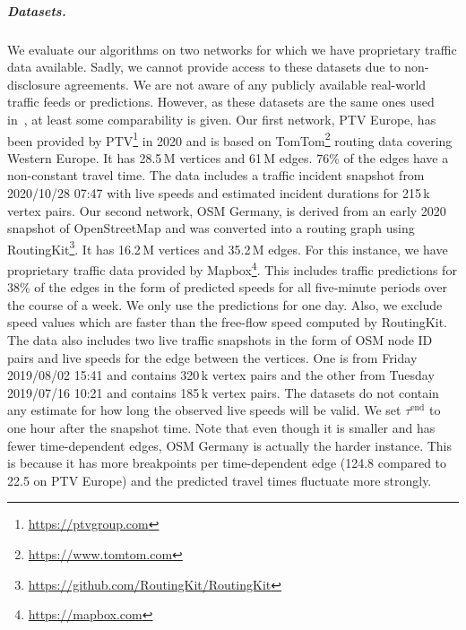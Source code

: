\documentclass[a4paper,UKenglish,cleveref, autoref, thm-restate]{lipics-v2021}
\newcommand*{\tend}{\tau^{\operatorname{end}}}
\begin{document}
\subparagraph{Datasets.}
We evaluate our algorithms on two networks for which we have proprietary traffic data available.
Sadly, we cannot provide access to these datasets due to non-disclosure agreements.
We are not aware of any publicly available real-world traffic feeds or predictions.
However, as these datasets are the same ones used in~\cite{swz-sfert-21,strasser_et_al:LIPIcs.SEA.2021.6}, at least some comparability is given.
%
Our first network, PTV Europe, has been provided by PTV\footnote{\url{https://ptvgroup.com}} in 2020 and is based on TomTom\footnote{\url{https://www.tomtom.com}} routing data covering Western Europe.
It has 28.5\,M vertices and 61\,M edges.
76\% of the edges have a non-constant travel time.
The data includes a traffic incident snapshot from 2020/10/28 07:47 with live speeds and estimated incident durations for 215\,k vertex pairs.
%
Our second network, OSM Germany, is derived from an early 2020 snapshot of OpenStreetMap and was converted into a routing graph using RoutingKit\footnote{\url{https://github.com/RoutingKit/RoutingKit}}.
It has 16.2\,M vertices and 35.2\,M edges.
For this instance, we have proprietary traffic data provided by Mapbox\footnote{\url{https://mapbox.com}}.
This includes traffic predictions for 38\% of the edges in the form of predicted speeds for all five-minute periods over the course of a week.
We only use the predictions for one day.
Also, we exclude speed values which are faster than the free-flow speed computed by RoutingKit.
The data also includes two live traffic snapshots in the form of OSM node ID pairs and live speeds for the edge between the vertices.
One is from Friday 2019/08/02 15:41 and contains 320\,k vertex pairs and the other from Tuesday 2019/07/16 10:21 and contains 185\,k vertex pairs.
The datasets do not contain any estimate for how long the observed live speeds will be valid.
We set $\tend$ to one hour after the snapshot time.
Note that even though it is smaller and has fewer time-dependent edges, OSM Germany is actually the harder instance.
This is because it has more breakpoints per time-dependent edge (124.8 compared to 22.5 on PTV Europe) and the predicted travel times fluctuate more strongly.
\end{document}
